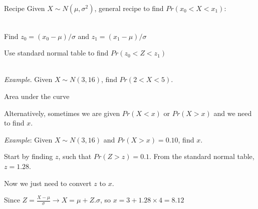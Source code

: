 \documentclass{./../div_teaching_slides}
\begin{document}
\begin{frame}{Recipe}
Given $X \sim N(\mu, \sigma^2)$, general recipe to find $Pr(x_0<X<x_1)$: \\~\\
\begin{witemize}
  \item Find $z_0 = (x_0-\mu)/\sigma$ and $z_1 = (x_1-\mu)/\sigma$
  \item Use standard normal table to find $Pr(z_0<Z<z_1)$ \\~\\
\end{witemize}

\textit{Example}. Given $X \sim N(3, 16)$, find $Pr(2 < X < 5)$.
\end{frame}

\begin{frame}{Area under the curve}
\begin{witemize}
  \item Alternatively, sometimes we are given $ Pr(X<x)$ or $Pr(X>x)$ and we need to find $x$. 
  \item \textit{Example}: Given $X \sim N(3, 16)$ and $ Pr(X>x) = 0.10$, find $x$. 
  \item Start by finding $z$, such that $Pr(Z>z)=0.1$. From the standard normal table, $z=1.28$.
  \item Now we just need to convert $z$ to $x$.
  \item Since $Z = \frac{X-\mu}{\sigma} \rightarrow X = \mu + Z.\sigma$, so $x = 3+1.28 \times 4 = 8.12$
\end{witemize}
\end{frame}
\end{document}
